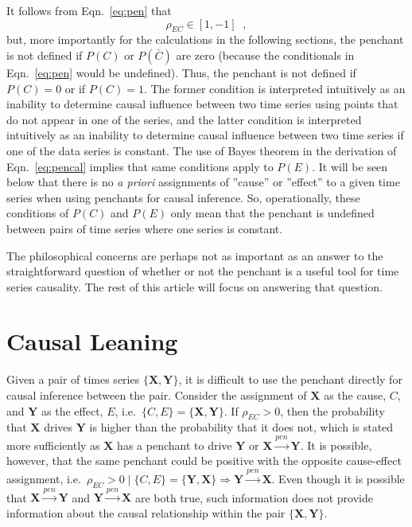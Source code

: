 \documentclass[a4paper,11pt,twocolumn]{article}
\begin{document}
It follows from Eqn.\ \ref{eq:pen} that
\begin{equation}
\rho_{EC}\in\left[1,-1\right]\;\;,
\end{equation}
but, more importantly for the calculations in the following sections, the penchant is not defined if $P(C)$ or $P(\bar{C})$ are zero (because the conditionals in Eqn.\ \ref{eq:pen} would be undefined).  Thus, the penchant is not defined if $P(C)=0$ or if $P(C)=1$.  The former condition is interpreted intuitively as an inability to determine causal influence between two time series using points that do not appear in one of the series, and the latter condition is interpreted intuitively as an inability to determine causal influence between two time series if one of the data series is constant.  The use of Bayes theorem in the derivation of Eqn.\ \ref{eq:pencal} implies that same conditions apply to $P(E)$.  It will be seen below that there is no {\em a priori} assignments of ''cause'' or ''effect'' to a given time series when using penchants for causal inference.  So, operationally, these conditions of $P(C)$ and $P(E)$ only mean that the penchant is undefined between pairs of time series where one series is constant. 

The philosophical concerns are perhaps not as important as an answer to the straightforward question of whether or not the penchant is a useful tool for time series causality.  The rest of this article will focus on answering that question.

\section{Causal Leaning}
Given a pair of times series $\{\mathbf{X},\mathbf{Y}\}$, it is difficult to use the penchant directly for causal inference between the pair.  Consider the assignment of $\mathbf{X}$ as the cause, $C$, and $\mathbf{Y}$ as the effect, $E$, i.e.\ $\{C,E\}=\{\mathbf{X},\mathbf{Y}\}$.  If $\rho_{EC}>0$, then the probability that $\mathbf{X}$ drives $\mathbf{Y}$ is higher than the probability that it does not, which is stated more sufficiently as $\mathbf{X}$ has a penchant to drive $\mathbf{Y}$ or $\mathbf{X}\xrightarrow{pen}\mathbf{Y}$.  It is possible, however, that the same penchant could be positive with the opposite cause-effect assignment, i.e.\ $\rho_{EC}>0\;|\; \{C,E\}=\{\mathbf{Y},\mathbf{X}\}\Rightarrow \mathbf{Y}\xrightarrow{pen}\mathbf{X}$.  Even though it is possible that $\mathbf{X}\xrightarrow{pen}\mathbf{Y}$ and $\mathbf{Y}\xrightarrow{pen}\mathbf{X}$ are both true, such information does not provide information about the causal relationship within the pair $\{\mathbf{X},\mathbf{Y}\}$.  
\end{document}
